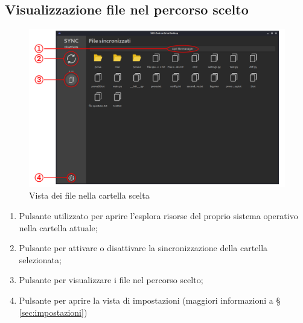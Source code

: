\subsection{Visualizzazione file nel percorso scelto}
\begin{figure}[H]
    \centering
    \includegraphics[scale = 0.30]{components/img/file-view.png}
    \caption{Vista dei file nella cartella scelta}
    \label{fig:Vista dei file nel percorso scelto}
\end{figure}
\begin{enumerate}
	\item Pulsante utilizzato per aprire l'esplora risorse del proprio sistema operativo nella cartella attuale;
	\item Pulsante per attivare o disattivare la sincronizzazione della cartella selezionata;
	\item Pulsante per visualizzare i file nel percorso scelto;
	\item Pulsante per aprire la vista di impostazioni (maggiori informazioni a \S{} \ref{sec:impostazioni})
\end{enumerate}


